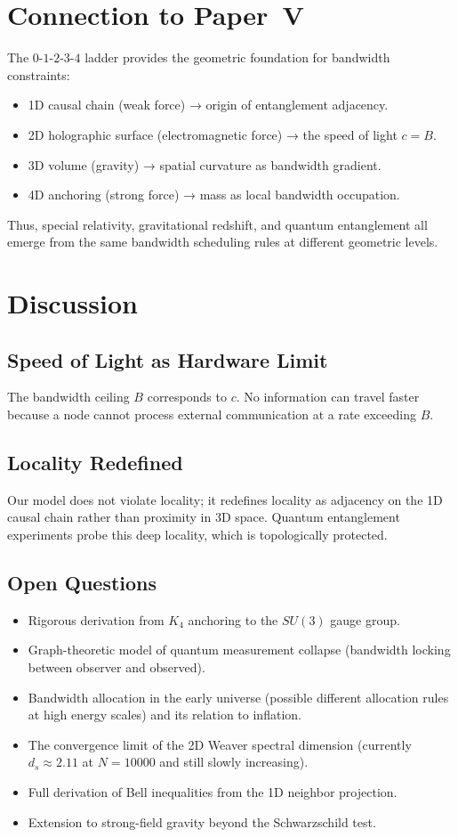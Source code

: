 \documentclass[12pt,a4paper]{article}
\begin{document}
\section{Connection to Paper~V}
The $0$-$1$-$2$-$3$-$4$ ladder provides the geometric foundation for bandwidth constraints:
\begin{itemize}
    \item 1D causal chain (weak force) → origin of entanglement adjacency.
    \item 2D holographic surface (electromagnetic force) → the speed of light $c=B$.
    \item 3D volume (gravity) → spatial curvature as bandwidth gradient.
    \item 4D anchoring (strong force) → mass as local bandwidth occupation.
\end{itemize}
Thus, special relativity, gravitational redshift, and quantum entanglement all emerge from the same bandwidth scheduling rules at different geometric levels.

\section{Discussion}
\subsection{Speed of Light as Hardware Limit}
The bandwidth ceiling $B$ corresponds to $c$. No information can travel faster because a node cannot process external communication at a rate exceeding $B$.

\subsection{Locality Redefined}
Our model does not violate locality; it redefines locality as adjacency on the 1D causal chain rather than proximity in 3D space. Quantum entanglement experiments probe this deep locality, which is topologically protected.

\subsection{Open Questions}
\begin{itemize}
    \item Rigorous derivation from $K_4$ anchoring to the $SU(3)$ gauge group.
    \item Graph-theoretic model of quantum measurement collapse (bandwidth locking between observer and observed).
    \item Bandwidth allocation in the early universe (possible different allocation rules at high energy scales) and its relation to inflation.
    \item The convergence limit of the 2D Weaver spectral dimension (currently $d_s\approx2.11$ at $N=10000$ and still slowly increasing).
    \item Full derivation of Bell inequalities from the 1D neighbor projection.
    \item Extension to strong-field gravity beyond the Schwarzschild test.
\end{itemize}
\end{document}
